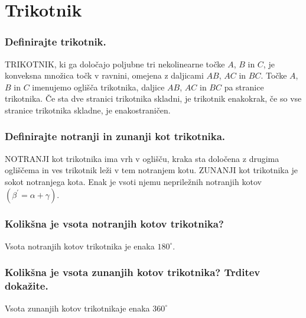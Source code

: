 \documentclass{article}
\begin{document}
\section{Trikotnik}
\subsubsection*{Definirajte trikotnik.}

TRIKOTNIK, ki ga določajo poljubne tri nekolinearne točke $A$, $B$ in $C$, je konveksna množica točk v ravnini, omejena z daljicami $AB$, $AC$ in $BC$. Točke $A$, $B$ in $C$ imenujemo oglišča trikotnika, daljice $AB$, $AC$ in $BC$ pa stranice trikotnika. Če sta dve stranici trikotnika skladni, je trikotnik enakokrak, če so vse stranice trikotnika skladne, je enakostraničen.

\subsubsection*{Definirajte notranji in zunanji kot trikotnika.}

NOTRANJI kot trikotnika ima vrh v oglišču, kraka sta določena z drugima ogliščema in ves trikotnik leži v tem notranjem kotu. ZUNANJI kot trikotnika je sokot notranjega kota. Enak je vsoti njemu nepriležnih notranjih kotov $\left(\beta^{\prime}=\alpha+\gamma\right)$.

\subsubsection*{Kolikšna je vsota notranjih kotov trikotnika?}

Vsota notranjih kotov trikotnika je enaka $180^{\circ}$.

\subsubsection*{Kolikšna je vsota zunanjih kotov trikotnika? Trditev dokažite.}

Vsota zunanjih kotov trikotnikaje enaka $360^{\circ}$
\end{document}
